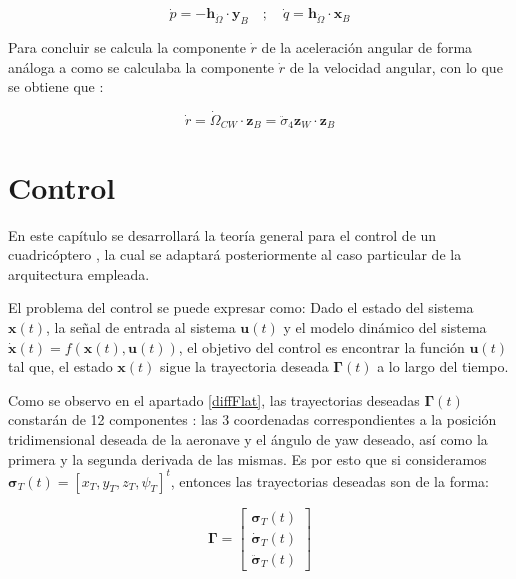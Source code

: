 \begin{equation}
	\dot p = -\textbf{h}_{\dot \Omega} \cdot \mathbf{y}_B \quad;\quad \dot q = \textbf{h}_{\dot \Omega}  \cdot \mathbf{x}_B
\end{equation}

Para concluir se calcula la componente $\dot{r}$ de la aceleración angular de forma análoga a como se calculaba la componente $\dot{r}$ de la velocidad angular, con lo que se obtiene que :

\begin{equation}
	 \dot r = \dot\Omega_{CW} \cdot \mathbf{z}_B =  \ddot \sigma_4 \mathbf{z}_W \cdot \mathbf{z}_B
	\end{equation}


\chapter{Control}
En este capítulo se desarrollará la teoría general para el control de un cuadricóptero \cite{MinimunSnap2011}\cite{mahony2012multirotor}\cite{amir2008modeling}\cite{mellinger2012trajectory}, la cual se adaptará posteriormente al caso particular de la arquitectura empleada.

El problema del control se puede expresar como: 
Dado el estado del sistema $\mathbf{x}(t)$, la señal de entrada al sistema $\mathbf{u}(t)$ y el modelo dinámico del sistema $ \mathbf{\dot x}(t) = f(\mathbf{x}(t),\mathbf{u}(t))$, el objetivo del control es encontrar la función $\mathbf{u}(t)$ tal que, el estado $\mathbf{x}(t)$ sigue la trayectoria deseada $\mathbf{\Gamma}(t)$ a lo largo del tiempo.

 Como se observo en el apartado \ref{diffFlat}, las trayectorias deseadas $\mathbf{\Gamma}(t)$ constarán de 12 componentes : las 3 coordenadas correspondientes a la posición tridimensional deseada de la aeronave y el ángulo de yaw deseado, así como la primera y la segunda derivada de las mismas. Es por esto que si consideramos $\mathbf{\sigma}_{T}(t) = [x_{T},y_{T},z_{T}, \psi_{T}]^t$, entonces las trayectorias deseadas son de la forma:
 
 \begin{equation}
 	\mathbf{\Gamma} = \begin{bmatrix}
 		\mathbf{\sigma}_{T}(t)\\
 		\mathbf{\dot \sigma}_{T}(t)\\
 		\mathbf{\ddot \sigma}_{T}(t)
 	\end{bmatrix}
 \end{equation}


